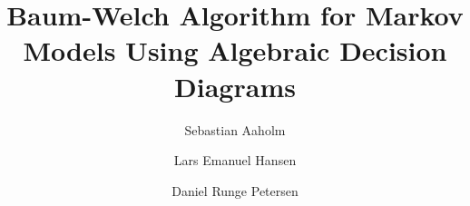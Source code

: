 




\title{Baum-Welch Algorithm for Markov Models Using Algebraic Decision Diagrams}

\author{Sebastian Aaholm
    \and Lars Emanuel Hansen
    \and Daniel Runge Petersen}

